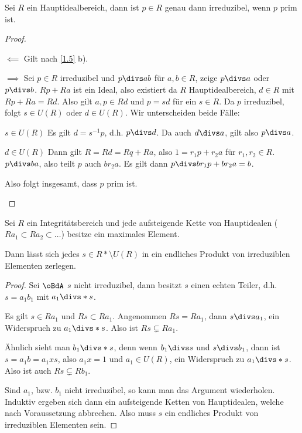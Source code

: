 \begin{lem} \label{1.7}
	Sei $R$ ein Hauptidealbereich, dann ist $p \in R$ genau dann irreduzibel, wenn $p$ prim ist.
	\begin{proof}
		\begin{segnb}{$\impliedby$}
			Gilt nach \ref{1.5} b).
		\end{segnb}
		\begin{segnb}{$\implies$}
			Sei $p \in R$ irreduzibel und $p \divs ab$ für $a, b \in R$, zeige $p \divs a$ oder $p \divs b$.
			$Rp + Ra$ ist ein Ideal, also existiert da $R$ Hauptidealbereich, $d \in R$ mit $Rp + Ra = Rd$.
			Also gilt $a,p \in Rd$ und $p = sd$ für ein $s \in R$.
			Da $p$ irreduzibel, folgt $s \in U(R)$ oder $d \in U(R)$.
			Wir unterscheiden beide Fälle:
			\begin{segnb}{$s\in U(R)$}
				Es gilt $d = s^{-1}p$, d.h. $p \divs d$.
				Da auch $d \divs a$, gilt also $p\divs a$.
			\end{segnb}
			\begin{segnb}{$d\in U(R)$}
				Dann gilt $R = Rd = Rq + Ra$, also $1 = r_1 p + r_2 a$ für $r_1, r_2 \in R$.
				$p \divs ba$, also teilt $p$ auch $b r_2 a$.
				Es gilt dann $p \divs b r_1 p + b r_2 a = b$.
			\end{segnb}
			Also folgt insgesamt, dass $p$ prim ist.
		\end{segnb}
	\end{proof}
\end{lem}

\begin{lem} \label{1.8}
	Sei $R$ ein Integritätsbereich und jede aufsteigende Kette von Hauptidealen ($Ra_1 \subset Ra_2 \subset \dotsc$) besitze ein maximales Element.

	Dann lässt sich jedes $s \in R* \setminus U(R)$ in ein endliches Produkt von irreduziblen Elementen zerlegen.
	\begin{proof}
		Sei $\oBdA$ $s$ nicht irreduzibel, dann besitzt $s$ einen echten Teiler, d.h. $s = a_1 b_1$ mit $a_1 \divs*  s$.

		Es gilt $s \in Ra_1$ und $Rs \subset Ra_1$.
		Angenommen $Rs = Ra_1$, dann $s \divs  a_1$, ein Widerspruch zu $a_1 \divs*  s$.
		Also ist $Rs \subsetneq Ra_1$.

		Ähnlich sieht man $b_1 \divs*  s$, denn wenn $b_1 \divs  s$ und $s \divs  b_1$, dann ist $s = a_1 b = a_1 x s$, also $a_1 x = 1$ und $a_1 \in U(R)$, ein Widerspruch zu $a_1 \divs* s$.
		Also ist auch $Rs \subsetneq Rb_1$.

		Sind $a_1$, bzw. $b_1$ nicht irreduzibel, so kann man das Argument wiederholen.
		Induktiv ergeben sich dann ein aufsteigende Ketten von Hauptidealen, welche nach Voraussetzung abbrechen.
		Also muss $s$ ein endliches Produkt von irreduziblen Elementen sein.
	\end{proof}
\end{lem}

